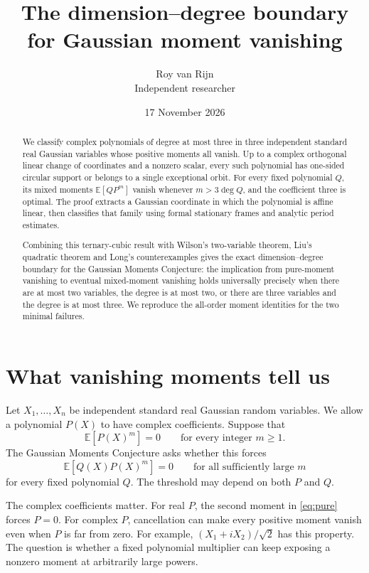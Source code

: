 \documentclass[11pt]{article}
\title{The dimension--degree boundary\\for Gaussian moment vanishing}
\author{Roy van Rijn\\{\small Independent researcher}}
\date{17 November 2026}
\theoremstyle{definition}\newtheorem{definition}[theorem]{Definition}
\theoremstyle{remark}\newtheorem{remark}[theorem]{Remark}
\newcommand{\E}{\mathbb E}
\begin{document}
\maketitle

\begin{abstract}
We classify complex polynomials of degree at most three in three
independent standard real Gaussian variables whose positive moments all
vanish. Up to a complex orthogonal linear change of coordinates and a
nonzero scalar, every such polynomial has one-sided circular support or
belongs to a single exceptional orbit. For every fixed polynomial $Q$,
its mixed moments $\E[QP^m]$ vanish whenever $m>3\deg Q$, and the
coefficient three is optimal. The proof extracts a Gaussian coordinate
in which the polynomial is affine linear, then classifies that family
using formal stationary frames and analytic period estimates.

Combining this ternary-cubic result with Wilson's two-variable theorem,
Liu's quadratic theorem and Long's counterexamples gives the exact
dimension--degree boundary for the Gaussian Moments Conjecture: the
implication from pure-moment vanishing to eventual mixed-moment
vanishing holds universally precisely when there are at most two
variables, the degree is at most two, or there are three variables and
the degree is at most three. We reproduce the all-order moment
identities for the two minimal failures.
\end{abstract}

\clearpage
\tableofcontents
\clearpage

\section{What vanishing moments tell us}\label{sec:introduction}

Let $X_1,\ldots,X_n$ be independent standard real Gaussian random
variables. We allow a polynomial $P(X)$ to have complex coefficients.
Suppose that
\begin{equation}\label{eq:pure}
  \E[P(X)^m]=0\qquad\text{for every integer }m\geq1.
\end{equation}
The Gaussian Moments Conjecture asks whether this forces
\begin{equation}\label{eq:safe}
  \E[Q(X)P(X)^m]=0\qquad\text{for all sufficiently large }m
\end{equation}
for every fixed polynomial $Q$. The threshold may depend on both $P$
and $Q$.

The complex coefficients matter. For real $P$, the second moment in
\eqref{eq:pure} forces $P=0$. For complex $P$, cancellation can make
every positive moment vanish even when $P$ is far from zero. For example,
$(X_1+iX_2)/\sqrt2$ has this property. The question is whether a fixed
polynomial multiplier can keep exposing a nonzero moment at arbitrarily
large powers.
\end{document}
